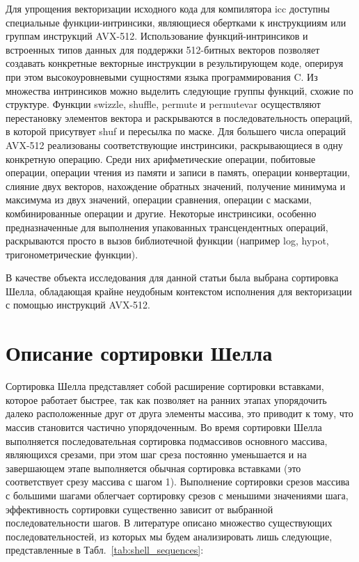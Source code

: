 \documentclass[utf8]{psta}
\begin{document}
Для упрощения векторизации исходного кода для компилятора icc доступны специальные функции-интринсики, являющиеся обертками к инструкцииям или группам инструкций AVX-512. Использование функций-интринсиков и встроенных типов данных для поддержки 512-битных векторов позволяет создавать конкретные векторные инструкции в результирующем коде, оперируя при этом высокоуровневыми сущностями языка программирования C. Из множества интринсиков можно выделить следующие группы функций, схожие по структуре. Функции swizzle, shuffle, permute и permutevar осуществляют перестановку элементов вектора и раскрываются в последовательность операций, в которой присутвует shuf и пересылка по маске. Для большего числа операций AVX-512 реализованы соответствующие инстринсики, раскрывающиеся в одну конкретную операцию. Среди них арифметические операции, побитовые операции, операции чтения из памяти и записи в память, операции конвертации, слияние двух векторов, нахождение обратных значений, получение минимума и максимума из двух значений, операции сравнения, операции с масками, комбинированные операции и другие. Некоторые инстринсики, особенно предназначенные для выполнения упакованных трансцендентных операций, раскрываются просто в вызов библиотечной функции (например log, hypot, тригонометрические функции).

В качестве объекта исследования для данной статьи была выбрана сортировка Шелла, обладающая крайне неудобным контекстом исполнения для векторизации с помощью инструкций AVX-512. 

\section{Описание сортировки Шелла}

Сортировка Шелла представляет собой расширение сортировки вставками, которое работает быстрее, так как позволяет на ранних этапах упорядочить далеко расположенные друг от друга элементы массива, это приводит к тому, что массив становится частично упорядоченным. 
Во время сортировки Шелла выполняется последовательная сортировка подмассивов основного массива, являющихся срезами, при этом шаг среза постоянно уменьшается и на завершающем этапе выполняется обычная сортировка вставками (это соответствует срезу массива с шагом 1).
Выполнение сортировки срезов массива с большими шагами облегчает сортировку срезов с меньшими значениями шага, эффективность сортировки существенно зависит от выбранной последовательности шагов. В литературе описано множество существующих последовательностей, из которых мы будем анализировать лишь следующие, представленные в Табл.~\ref{tab:shell_sequences}:
\end{document}
